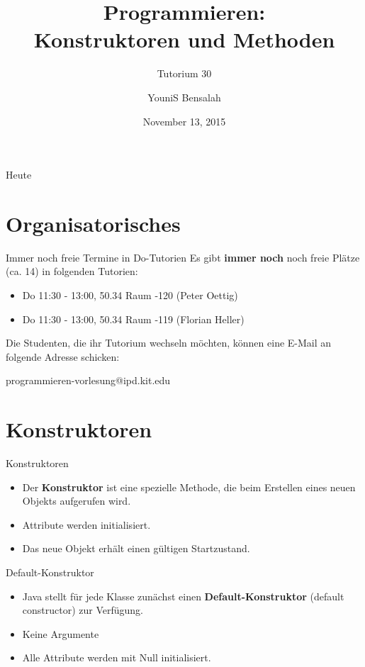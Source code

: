 \documentclass[18pt]{beamer}
\title[Konstruktoren und Methoden]{Programmieren:\\ Konstruktoren und Methoden}
\subtitle{Tutorium 30}
\author{YouniS Bensalah}
\date{November 13, 2015}
\institute{Chair for Software Design and Quality}
\begin{document}

\begin{frame}
\titlepage
\end{frame}

\begin{frame}{Heute}
\tableofcontents
\end{frame}

\section{Organisatorisches}

\begin{frame}{Immer noch freie Termine in Do-Tutorien}
    Es gibt \textbf{immer noch} noch freie Plätze (ca. 14) in folgenden Tutorien:
    \begin{itemize}
        \item Do 11:30 - 13:00, 50.34 Raum -120 (Peter Oettig)
        \item Do 11:30 - 13:00, 50.34 Raum -119 (Florian Heller)
    \end{itemize}
    Die Studenten, die ihr Tutorium wechseln möchten, können eine E-Mail an folgende Adresse schicken:\\
    \begin{center}
    {\Large programmieren-vorlesung@ipd.kit.edu}
    \end{center}
\end{frame}

\section{Konstruktoren}

\begin{frame}{Konstruktoren}
    \begin{itemize}
        \item Der \textbf{Konstruktor} ist eine spezielle Methode, die beim Erstellen eines neuen Objekts aufgerufen wird.
        \item Attribute werden initialisiert.
        \item Das neue Objekt erhält einen gültigen Startzustand.
    \end{itemize}
\end{frame}

\begin{frame}{Default-Konstruktor}
    \begin{itemize}
        \item Java stellt für jede Klasse zunächst einen \textbf{Default-Konstruktor} (default constructor) zur Verfügung.
        \item Keine Argumente
        \item Alle Attribute werden mit Null initialisiert.
    \end{itemize}

\end{frame}
\end{document}

